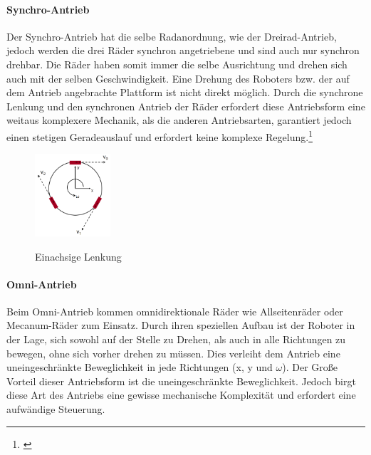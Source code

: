 \paragraph{Synchro-Antrieb}
Der Synchro-Antrieb hat die selbe Radanordnung, wie der Dreirad-Antrieb, jedoch werden die drei Räder synchron angetriebene und sind auch nur synchron drehbar. Die Räder haben somit immer die selbe Ausrichtung und drehen sich auch mit der selben Geschwindigkeit. Eine Drehung des Roboters bzw. der auf dem Antrieb angebrachte Plattform ist nicht direkt möglich.
\newline
Durch die synchrone Lenkung und den synchronen Antrieb der Räder erfordert diese Antriebsform eine weitaus komplexere Mechanik, als die anderen Antriebsarten, garantiert jedoch einen stetigen Geradeauslauf und erfordert keine komplexe Regelung.\footnote{\citep[vgl.][Mobile Roboter, Seite 107 f.]{Hertzberg.MobileRoboter}\label{note22}}
\begin{figure}
	\vspace{-0.5cm}
	\begin{center}
		\includegraphics[width=0.25\textwidth]{images/technische_grundlagen/Omniantrieb.png}
	\end{center}
	\caption{Einachsige Lenkung}
	\cite{MarkusStrand.Robotikscript}
	\label{fig:einachsenlenkung}
\end{figure}
\paragraph{Omni-Antrieb}
Beim Omni-Antrieb kommen omnidirektionale Räder wie Allseitenräder oder Mecanum-Räder zum Einsatz. Durch ihren speziellen Aufbau ist der Roboter in der Lage, sich sowohl auf der Stelle zu Drehen, als auch in alle Richtungen zu bewegen, ohne sich vorher drehen zu müssen. Dies verleiht dem Antrieb eine uneingeschränkte Beweglichkeit in jede Richtungen (x, y und $\omega{}$).
\newline
Der Große Vorteil dieser Antriebsform ist die uneingeschränkte Beweglichkeit. Jedoch birgt diese Art des Antriebs eine gewisse mechanische Komplexität und erfordert eine aufwändige Steuerung.

